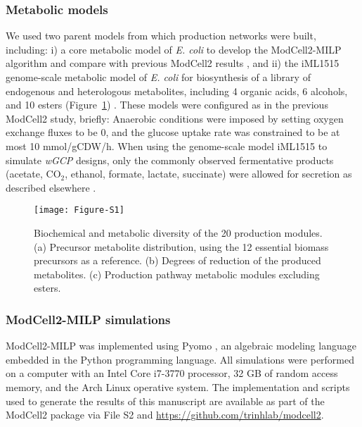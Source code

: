 \subsubsection{Metabolic models}
We used two parent models from which production networks were built, including: i) a core metabolic model of \textit{E. coli} \citep{trinh2015} to develop the ModCell2-MILP algorithm and compare with previous ModCell2 results \citep{garcia2019}, and ii) the iML1515 genome-scale metabolic model of \textit{E. coli}\citep{monk2017} for biosynthesis of a library of endogenous and heterologous metabolites, including 4 organic acids, 6 alcohols, and 10 esters (Figure~\ref{fig5:fig-s1}) \citep{akita2016, atsumi2008, layton2014, niu2014, rodriguez2014, shen2011, trinh2008, tseng2012, yim2011, yu2014}.
These models were configured as in the previous ModCell2 study\citep{garcia2019}, briefly: Anaerobic conditions were imposed by setting oxygen exchange fluxes to be 0, and the glucose uptake rate was constrained to be at most 10 mmol/gCDW/h. When using the genome-scale model iML1515 to simulate \emph{wGCP} designs, only the commonly observed fermentative products (acetate, CO$_2$, ethanol, formate, lactate, succinate) were allowed for secretion as described elsewhere \citep{kamp2017}.
\begin{figure}[h]
    \caption[Biochemical and metabolic diversity of the 20 production modules]{
Biochemical and metabolic diversity of the 20 production modules. (a) Precursor metabolite distribution, using the 12 essential biomass precursors as a reference. (b) Degrees of reduction of the produced metabolites. (c) Production pathway metabolic modules excluding esters.
    }
    \centering
    \texttt{[image: Figure-S1]}
    \label{fig5:fig-s1}
\end{figure}

\subsubsection{ModCell2-MILP simulations}
ModCell2-MILP was implemented using Pyomo \citep{hart2017}, an algebraic modeling language embedded in the Python programming language. All simulations were performed on a computer with an Intel Core i7-3770 processor, 32 GB of random access memory, and the Arch Linux operative system. The implementation and scripts used to generate the results of this manuscript are available as part of the ModCell2 package via File S2  and \url{https://github.com/trinhlab/modcell2}.
